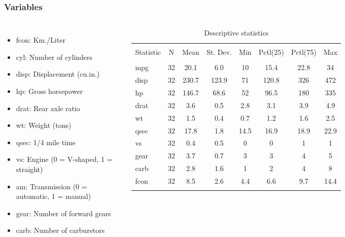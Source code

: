 \documentclass[aspectratio=169]{beamer}
\begin{document}
\begin{frame}
\frametitle{Variables}

\begin{columns}

\scriptsize
{}
\begin{itemize}
\item	fcon:	Km./Liter
\item	cyl:	Number of cylinders
\item	disp:	Displacement (cu.in.)
\item	hp:	Gross horsepower
\item	drat:	Rear axle ratio
\item	wt:	Weight (tons)
\item	qsec:	1/4 mile time
\item	vs:	Engine (0 = V-shaped, 1 = straight)
\item	am:	Transmission (0 = automatic, 1 = manual)
\item	gear:	Number of forward gears
\item	carb:	Number of carburetors
\end{itemize}


\tiny
\begin{table}[!htbp] \centering 
  \caption{Descriptive statistics} 
  \label{} 
\begin{tabular}{@{\extracolsep{5pt}}lccccccc} 
\\[-1.8ex]\hline 
\hline \\[-1.8ex] 
Statistic & \multicolumn{1}{c}{N} & \multicolumn{1}{c}{Mean} & \multicolumn{1}{c}{St. Dev.} & \multicolumn{1}{c}{Min} & \multicolumn{1}{c}{Pctl(25)} & \multicolumn{1}{c}{Pctl(75)} & \multicolumn{1}{c}{Max} \\ 
\hline \\[-1.8ex] 
mpg & 32 & 20.1 & 6.0 & 10 & 15.4 & 22.8 & 34 \\ 
disp & 32 & 230.7 & 123.9 & 71 & 120.8 & 326 & 472 \\ 
hp & 32 & 146.7 & 68.6 & 52 & 96.5 & 180 & 335 \\ 
drat & 32 & 3.6 & 0.5 & 2.8 & 3.1 & 3.9 & 4.9 \\ 
wt & 32 & 1.5 & 0.4 & 0.7 & 1.2 & 1.6 & 2.5 \\ 
qsec & 32 & 17.8 & 1.8 & 14.5 & 16.9 & 18.9 & 22.9 \\ 
vs & 32 & 0.4 & 0.5 & 0 & 0 & 1 & 1 \\ 
gear & 32 & 3.7 & 0.7 & 3 & 3 & 4 & 5 \\ 
carb & 32 & 2.8 & 1.6 & 1 & 2 & 4 & 8 \\ 
fcon & 32 & 8.5 & 2.6 & 4.4 & 6.6 & 9.7 & 14.4 \\ 
\hline \\[-1.8ex] 
\end{tabular} 
\end{table} 

\end{columns}
\end{frame}
\end{document}
